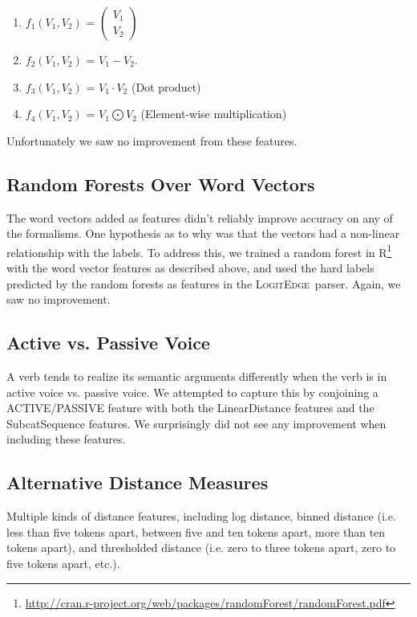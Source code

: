\documentclass[11pt]{article}
\newcommand{\logitedge}{\textsc{LogitEdge}}
\begin{document}
\begin{enumerate}
\item $f_1(V_1,V_2)$ = $ \left( \begin{smallmatrix} V_1\\ V_2 \end{smallmatrix} \right)$
\item $f_2(V_1,V_2)$ = $V_1 - V_2$.
\item $f_3(V_1,V_2)$ = $V_1 \cdot V_2$ (Dot product)
\item $f_4(V_1,V_2)$ = $V_1 \bigodot V_2$ (Element-wise multiplication)
\end{enumerate}
Unfortunately we saw no improvement from these features.

\subsection{Random Forests Over Word Vectors}
The word vectors added as features didn't reliably improve accuracy on any of
the formalisms.
One hypothesis as to why was that the vectors had a non-linear relationship
with the labels.
To address this, we trained a random forest in
R\footnote{\url{http://cran.r-project.org/web/packages/randomForest/randomForest.pdf}}
with the word vector features as described above, and used the hard labels
predicted by the random forests as features in the \logitedge\ parser.
Again, we saw no improvement.

\subsection{Active vs. Passive Voice}
A verb tends to realize its semantic arguments differently when the verb is in
active voice vs. passive voice.
We attempted to capture this by conjoining a ACTIVE/PASSIVE feature with both
the LinearDistance features and the SubcatSequence features.
We surprisingly did not see any improvement when including these features.

\subsection{Alternative Distance Measures}
Multiple kinds of distance features, including log distance, binned distance (i.e. less than five tokens apart, between five and ten tokens apart, more than ten tokens apart), and thresholded distance (i.e. zero to three tokens apart, zero to five tokens apart, etc.).
\end{document}
